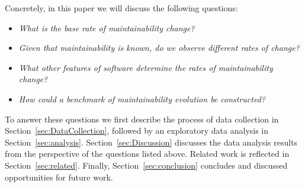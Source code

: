 Concretely, in this paper we will discuss the following questions:
\begin{itemize}
\item \textit{What is the base rate of maintainability change?}
\item \textit{Given that maintainability is known, do we observe different rates of change?}
\item \textit{What other features of software determine the rates of maintainability change?}
\item \textit{How could a benchmark of maintainability evolution be constructed?}
\end{itemize}

To answer these questions we first describe the process of data collection in Section~\ref{sec:DataCollection}, followed by an exploratory data analysis in Section~\ref{sec:analysis}. Section~\ref{sec:Discussion} discusses the data analysis results from the perspective of the questions listed above. Related work is reflected in Section~\ref{sec:related}. Finally, Section~\ref{sec:conclusion} concludes and discussed opportunities for future work.

